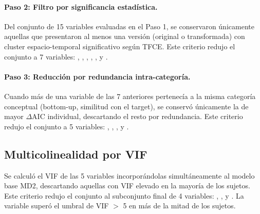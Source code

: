 \paragraph{Paso 2: Filtro por significancia estadística.}
Del conjunto de 15 variables evaluadas en el Paso 1, se conservaron únicamente aquellas
que presentaron al menos una versión (original o transformada) con cluster
espacio-temporal significativo según TFCE. Este criterio redujo el conjunto a 7 variables:
, , ,
, , 
y .

\paragraph{Paso 3: Reducción por redundancia intra-categoría.}
Cuando más de una variable de las 7 anteriores pertenecía a la misma categoría conceptual
(bottom-up, similitud con el target), se conservó únicamente la de mayor $\Delta$AIC
individual, descartando el resto por redundancia. Este criterio redujo el conjunto a
5 variables: , ,
,  y .

\subsection{Multicolinealidad por VIF}
\begin{sloppypar}
Se calculó el VIF de las 5 variables incorporándolas simultáneamente al modelo
base MD2, descartando aquellas con VIF elevado en la mayoría de los sujetos. Este criterio
redujo el conjunto al subconjunto final de 4 variables:
, , 
y . La variable  superó el umbral
de VIF $>$ 5 en más de la mitad de los sujetos.
\end{sloppypar}


